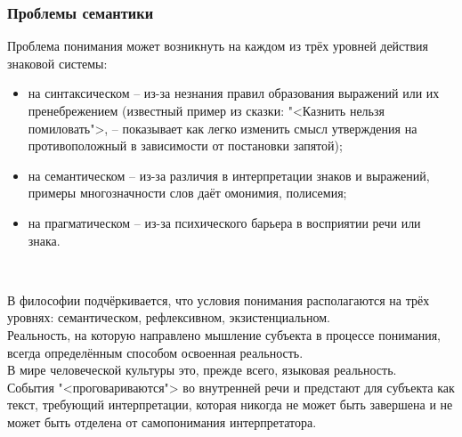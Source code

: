 \documentclass[main.tex]{subfiles}
\begin{document}
\subsubsection{Проблемы семантики}

{\parindent0pt
Проблема понимания может возникнуть на каждом из трёх уровней действия знаковой системы:
\begin{itemize}[nosep,leftmargin=0.5cm]
\item на синтаксическом -- из-за незнания правил образования выражений или их пренебрежением (известный пример из сказки: "<Казнить нельзя помиловать">, -- показывает как легко изменить смысл утверждения на противоположный в зависимости от постановки запятой);
\item на семантическом -- из-за различия в интерпретации знаков и выражений, примеры многозначности слов даёт омонимия, полисемия;
\item на прагматическом -- из-за психического барьера в восприятии речи или знака.
\end{itemize}
}
\ 

{\parindent0pt
В философии подчёркивается, что условия понимания располагаются на трёх уровнях: семантическом, рефлексивном, экзистенциальном.
}
\ \\

{\parindent0pt
Реальность, на которую направлено мышление субъекта в процессе понимания, всегда определённым способом освоенная реальность.
}
\ \\

{\parindent0pt
В мире человеческой культуры это, прежде всего, языковая реальность.
}
\ \\

{\parindent0pt
События "<проговариваются"> во внутренней речи и предстают для субъекта как текст, требующий интерпретации, которая никогда не может быть завершена и не может быть отделена от самопонимания интерпретатора.
}
\ \\
\end{document}
